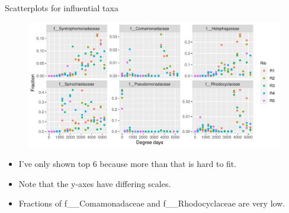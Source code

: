 \documentclass{beamer}
\begin{document}
\begin{frame}{Scatterplots for influential taxa}

  \begin{center}
    \begin{figure}
      \includegraphics[width=4.75in]{use_families/w_ribs/infl_rib_family_scatter}
    \end{figure}
  \end{center}
  \vspace{-0.25in}
  {\scriptsize
  \begin{itemize}
  \item I've only shown top 6 because more than that is hard to fit.
  \item Note that the y-axes have differing scales.
  \item Fractions of f\_\_Comamonadaceae and f\_\_Rhodocyclaceae are very low.
  \end{itemize}
  }


\end{frame}
\end{document}
